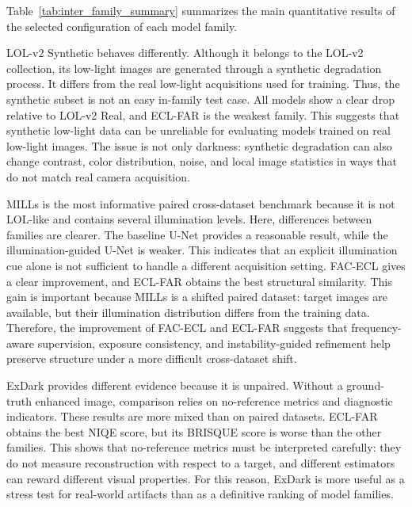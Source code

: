 Table~\ref{tab:inter_family_summary} summarizes the main quantitative results of the selected configuration of each model family.



LOL-v2 Synthetic behaves differently. Although it belongs to the LOL-v2 collection, its low-light images are generated through a synthetic degradation process. It differs from the real low-light acquisitions used for training. Thus, the synthetic subset is not an easy in-family test case. All models show a clear drop relative to LOL-v2 Real, and ECL-FAR is the weakest family. This suggests that synthetic low-light data can be unreliable for evaluating models trained on real low-light images. The issue is not only darkness: synthetic degradation can also change contrast, color distribution, noise, and local image statistics in ways that do not match real camera acquisition.

MILLs is the most informative paired cross-dataset benchmark because it is not LOL-like and contains several illumination levels. Here, differences between families are clearer. The baseline U-Net provides a reasonable result, while the illumination-guided U-Net is weaker. This indicates that an explicit illumination cue alone is not sufficient to handle a different acquisition setting. FAC-ECL gives a clear improvement, and ECL-FAR obtains the best structural similarity. This gain is important because MILLs is a shifted paired dataset: target images are available, but their illumination distribution differs from the training data. Therefore, the improvement of FAC-ECL and ECL-FAR suggests that frequency-aware supervision, exposure consistency, and instability-guided refinement help preserve structure under a more difficult cross-dataset shift.

ExDark provides different evidence because it is unpaired. Without a ground-truth enhanced image, comparison relies on no-reference metrics and diagnostic indicators. These results are more mixed than on paired datasets. ECL-FAR obtains the best NIQE score, but its BRISQUE score is worse than the other families. This shows that no-reference metrics must be interpreted carefully: they do not measure reconstruction with respect to a target, and different estimators can reward different visual properties. For this reason, ExDark is more useful as a stress test for real-world artifacts than as a definitive ranking of model families.

